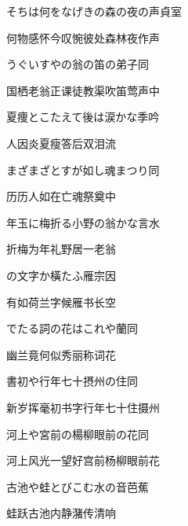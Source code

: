 \begin{haiku}
    {\FH そちは何をなげきの森の夜の声}\hfill{\FH 貞室}

    {\FK 何物感怀今叹惋彼处森林夜作声}
\end{haiku}

\begin{haiku}
    {\FH うぐいすやの翁の笛の弟子}\hfill{\FH 同}

    {\FK 国栖老翁正课徒教渠吹笛莺声中}
\end{haiku}

\begin{haiku}
    {\FH 夏痩とこたえて後は涙かな}\hfill{\FH 季吟}

    {\FK 人因炎夏瘦答后双泪流}
\end{haiku}

\begin{haiku}
    {\FH まざまざとすが如し魂まつり}\hfill{\FH 同}

    {\FK 历历人如在亡魂祭奠中}
\end{haiku}

\begin{haiku}
    {\FH 年玉に梅折る小野の翁かな}\hfill{\FH 言水}

    {\FK 折梅为年礼野居一老翁}
\end{haiku}

\begin{haiku}
    {\FH {}の文字か橫たふ雁}\hfill{\FH 宗因}

    {\FK 有如荷兰字候雁书长空}
\end{haiku}

\begin{haiku}
    {\FH {}でたる詞の花はこれや蘭}\hfill{\FH 同}

    {\FK 幽兰竟何似秀丽称词花}
\end{haiku}

\begin{haiku}
    {\FH 書初や行年七十摂州の住}\hfill{\FH 同}

    {\FK 新岁挥毫初书字行年七十住摄州}
\end{haiku}

\begin{haiku}
    {\FH 河上や宮前の楊柳眼前の花}\hfill{\FH 同}

    {\FK 河上风光一望好宫前杨柳眼前花}
\end{haiku}

\begin{haiku}
    {\FH 古池や蛙とびこむ水の音}\hfill{\FH 芭蕉}

    {\FK 蛙跃古池内静潴传清响}
\end{haiku}

